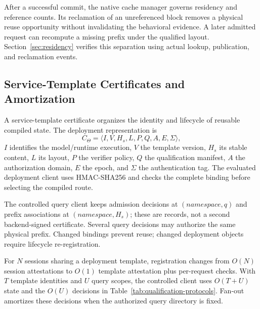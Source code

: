 After a successful commit, the native cache manager governs residency and reference counts. Its reclamation of an unreferenced block removes a physical reuse opportunity without invalidating the behavioral evidence. A later admitted request can recompute a missing prefix under the qualified layout. Section~\ref{sec:residency} verifies this separation using actual lookup, publication, and reclamation events.

\subsection{Service-Template Certificates and Amortization}
\label{sec:template}
A service-template certificate organizes the identity and lifecycle of reusable compiled state. The deployment representation is
\begin{equation}
 C_\Theta=\langle I,V,H_s,L,P,Q,A,E,\Sigma\rangle,
\end{equation}
$I$ identifies the model/runtime execution, $V$ the template version, $H_s$ its stable content, $L$ its layout, $P$ the verifier policy, $Q$ the qualification manifest, $A$ the authorization domain, $E$ the epoch, and $\Sigma$ the authentication tag. The evaluated deployment client uses HMAC-SHA256 and checks the complete binding before selecting the compiled route.

The controlled query client keeps admission decisions at $(\textit{namespace},q)$ and prefix associations at $(\textit{namespace},H_s)$; these are records, not a second backend-signed certificate. Several query decisions may authorize the same physical prefix. Changed bindings prevent reuse; changed deployment objects require lifecycle re-registration.

For $N$ sessions sharing a deployment template, registration changes from $O(N)$ session attestations to $O(1)$ template attestation plus per-request checks. With $T$ template identities and $U$ query scopes, the controlled client uses $O(T+U)$ state and the $O(U)$ decisions in Table~\ref{tab:qualification-protocols}. Fan-out amortizes these decisions when the authorized query directory is fixed.

